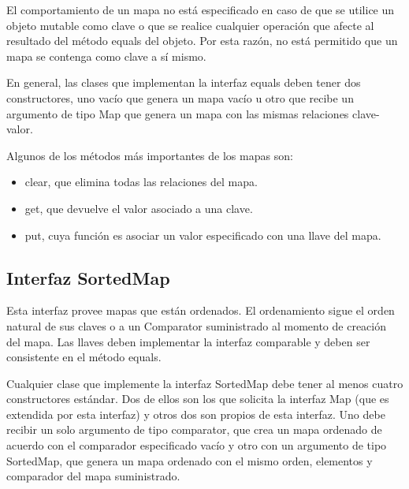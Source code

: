 \documentclass[11pt]{article}
\begin{document}
El comportamiento de un mapa no está especificado en caso de que se 
utilice un objeto mutable como clave o que se realice cualquier 
operación que afecte al resultado del método equals del objeto. Por 
esta razón, no está permitido que un mapa se contenga como clave a sí 
mismo.

\par

En general, las clases que implementan la interfaz equals deben tener 
dos constructores, uno vacío que genera un mapa vacío u otro que 
recibe un argumento de tipo Map que genera un mapa con las mismas 
relaciones clave-valor.

\par

Algunos de los métodos más importantes de los mapas son:

\begin{itemize}

\item clear, que elimina todas las relaciones del mapa.

\item get, que devuelve el valor asociado a una clave.

\item put, cuya función es asociar un valor especificado con una 
llave del mapa.

\end{itemize}

\subsection{Interfaz SortedMap}

\par

Esta interfaz provee mapas que están ordenados. El ordenamiento sigue 
el orden natural de sus claves o a un Comparator suministrado al 
momento de creación del mapa. Las llaves deben implementar la 
interfaz comparable y deben ser consistente en el método equals.
\par
Cualquier clase que implemente la interfaz SortedMap debe tener al 
menos cuatro constructores estándar. Dos de ellos son los que 
solicita la interfaz Map (que es extendida por esta interfaz) y otros 
dos son propios de esta interfaz. Uno debe recibir un solo argumento 
de tipo comparator, que crea un mapa ordenado de acuerdo con el 
comparador especificado vacío y otro con un argumento de tipo 
SortedMap, que genera un mapa ordenado con el mismo orden, elementos 
y comparador del mapa suministrado.
\end{document}
